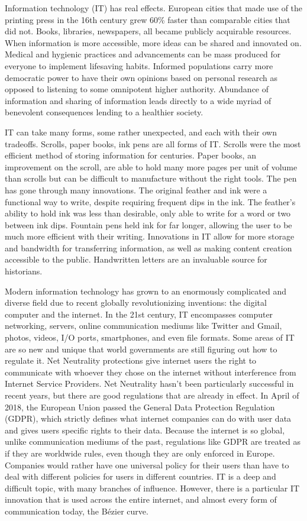 \documentclass[12pt,letterpaper]{article}
\begin{document}
Information technology (IT) has real effects. European cities that made use of the printing press in the 16th century grew 60\% faster than comparable cities that did not. \citep{press} Books, libraries, newspapers, all became publicly acquirable resources. When information is more accessible, more ideas can be shared and innovated on. Medical and hygienic practices and advancements can be mass produced for everyone to implement lifesaving habits. Informed populations carry more democratic power to have their own opinions based on personal research as opposed to listening to some omnipotent higher authority. Abundance of information and sharing of information leads directly to a wide myriad of benevolent consequences lending to a healthier society. 

IT can take many forms, some rather unexpected, and each with their own tradeoffs. Scrolls, paper books, ink pens are all forms of IT. Scrolls were the most efficient method of storing information for centuries. Paper books, an improvement on the scroll, are able to hold many more pages per unit of volume than scrolls but can be difficult to manufacture without the right tools. The pen has gone through many innovations. The original feather and ink were a functional way to write, despite requiring frequent dips in the ink. The feather’s ability to hold ink was less than desirable, only able to write for a word or two between ink dips. Fountain pens held ink for far longer, allowing the user to be much more efficient with their writing. Innovations in IT allow for more storage and bandwidth for transferring information, as well as making content creation accessible to the public. Handwritten letters are an invaluable source for historians. 

Modern information technology has grown to an enormously complicated and diverse field due to recent globally revolutionizing inventions: the digital computer and the internet. In the 21st century, IT encompasses computer networking, servers, online communication mediums like Twitter and Gmail, photos, videos, I/O ports, smartphones, and even file formats. Some areas of IT are so new and unique that world governments are still figuring out how to regulate it. Net Neutrality protections give internet users the right to communicate with whoever they chose on the internet without interference from Internet Service Providers. Net Neutrality hasn’t been particularly successful in recent years, but there are good regulations that are already in effect. In April of 2018, the European Union passed the General Data Protection Regulation (GDPR), which strictly defines what internet companies can do with user data and gives users specific rights to their data. Because the internet is so global, unlike communication mediums of the past, regulations like GDPR are treated as if they are worldwide rules, even though they are only enforced in Europe. Companies would rather have one universal policy for their users than have to deal with different policies for users in different countries. IT is a deep and difficult topic, with many branches of influence. However, there is a particular IT innovation that is used across the entire internet, and almost every form of communication today, the Bézier curve. 
\end{document}
